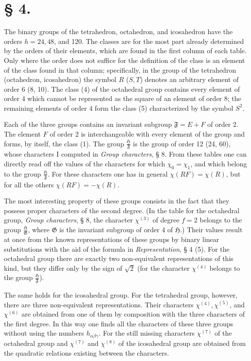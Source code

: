 \documentclass[11pt]{article}
\newcommand{\Hgr}{\mathfrak{H}}
\newcommand{\Ggr}{\mathfrak{G}}
\newcommand{\Fgr}{\mathfrak{F}}
\begin{document}
\section*{§ 4.}

The binary groups of the tetrahedron, octahedron, and icosahedron have the orders $h=24,48$, and 120. The classes are for the most part already determined by the orders of their elements, which are found in the first column of each table. Only where the order does not suffice for the definition of the class is an element of the class found in that column; specifically, in the group of the tetrahedron (octahedron, icosahedron) the symbol $R$ ($S,T$) denotes an arbitrary element of order 6 (8, 10). The class (4) of the octahedral group contains every element of order 4 which cannot be represented as the square of an element of order 8; the remaining elements of order 4 form the class (5) characterized by the symbol $S^2$.

Each of the three groups contains an invariant subgroup $\Fgr=E+F$ of order 2. The element $F$ of order 2 is interchangeable with every element of the group and forms, by itself, the class (1). The group $\frac{\Hgr}{\Fgr}$ is the group of order 12 (24, 60), whose characters I computed in \emph{Group characters}, § 8. From these tables one can directly read off the values of the characters for which $\chi_0=\chi_1$, and which belong to the group $\frac{\Hgr}{\Fgr}$. For these characters one has in general $\chi(RF)=\chi(R)$, but for all the others $\chi(RF)=-\chi(R)$.

The most interesting property of these groups consists in the fact that they possess proper characters of the second degree. (In the table for the octahedral group, \emph{Group characters}, § 8, the character $\chi^{(3)}$ of degree $f=2$ belongs to the group $\frac{\Hgr}{\Ggr}$, where $\Ggr$ is the invariant subgroup of order 4 of $\Hgr$.) Their values result at once from the known representations of these groups by binary linear substitutions with the aid of the formula in \emph{Representation}, § 4 (5). For the octahedral group there are exactly two non-equivalent representations of this kind, but they differ only by the sign of $\sqrt2$ (for the character $\chi^{(4)}$ belongs to the group $\frac{\Hgr}{\Fgr}$).

The same holds for the icosahedral group. For the tetrahedral group, however, there are three non-equivalent representations. Their characters $\chi^{(4)},\chi^{(5)}$, and $\chi^{(6)}$ are obtained from one of them by composition with the three characters of the first degree. In this way one finds all the characters of these three groups without using the numbers $h_{\alpha\beta\gamma}$. For the still missing characters $\chi^{(7)}$ of the octahedral group and $\chi^{(7)}$ and $\chi^{(8)}$ of the icosahedral group are obtained from the quadratic relations existing between the characters.
\end{document}
